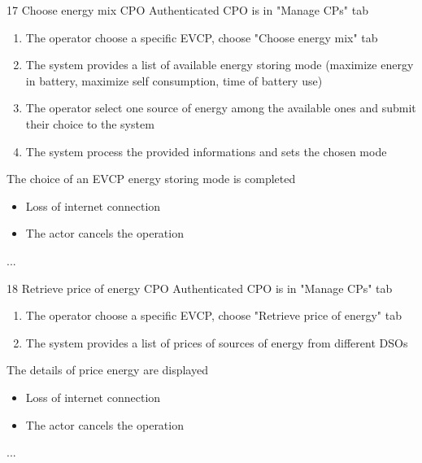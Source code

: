 \usecase
{17}
{Choose energy mix} %
{CPO} %
{Authenticated CPO is in "Manage CPs" tab} %
{ %
    \begin{enumerate}
        \item The operator choose a specific EVCP, choose "Choose energy mix" tab
        \item The system provides a list of available energy storing mode (maximize energy in battery, maximize self consumption, time of battery use)
        \item The operator select one source of energy among the available ones and submit their choice to the system
        \item The system process the provided informations and sets the chosen mode
    \end{enumerate}
}
{The choice of an EVCP energy storing mode is completed} %
{ %
    \begin{itemize}
        \item Loss of internet connection
        \item The actor cancels the operation
    \end{itemize}
}
{ %
    ...
}

\usecase
{18}
{Retrieve price of energy} %
{CPO} %
{Authenticated CPO is in "Manage CPs" tab} %
{ %
    \begin{enumerate}
        \item The operator choose a specific EVCP, choose "Retrieve price of energy" tab
        \item The system provides a list of prices of sources of energy from different DSOs
    \end{enumerate}
}
{The details of price energy are displayed} %
{ %
    \begin{itemize}
        \item Loss of internet connection
        \item The actor cancels the operation
    \end{itemize}
}
{ %
    ...
}

